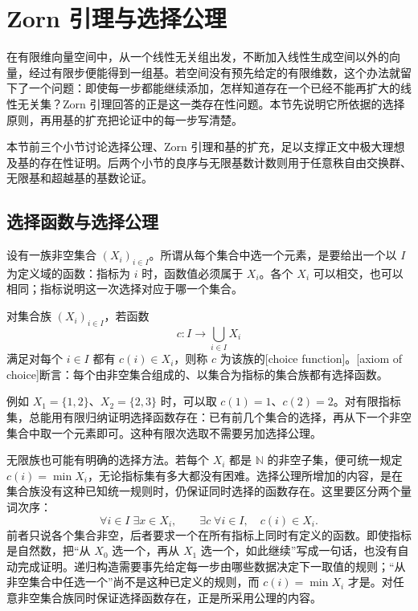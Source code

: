 
\section{Zorn 引理与选择公理}
\label{b1:sec:A01}

在有限维向量空间中，从一个线性无关组出发，不断加入线性生成空间以外的向量，经过有限步便能得到一组基。若空间没有预先给定的有限维数，这个办法就留下了一个问题：即使每一步都能继续添加，怎样知道存在一个已经不能再扩大的线性无关集？Zorn 引理回答的正是这一类存在性问题。本节先说明它所依据的选择原则，再用基的扩充把论证中的每一步写清楚。

\ProseParagraphBreak
本节前三个小节讨论选择公理、Zorn 引理和基的扩充，足以支撑正文中极大理想及基的存在性证明。后两个小节的良序与无限基数计数则用于任意秩自由交换群、无限基和超越基的基数论证。

\subsection{选择函数与选择公理}
\label{b1:subsec:A01:01}

设有一族非空集合 \((X_i)_{i\in I}\)。所谓从每个集合中选一个元素，是要给出一个以 \(I\) 为定义域的函数：指标为 \(i\) 时，函数值必须属于 \(X_i\)。各个 \(X_i\) 可以相交，也可以相同；指标说明这一次选择对应于哪一个集合。

\begin{definition}[选择公理]\label{b1:def:A-choice}
	对集合族 \((X_i)_{i\in I}\)，若函数
	\[
		c:I\longrightarrow\bigcup_{i\in I}X_i
	\]
	满足对每个 \(i\in I\) 都有 \(c(i)\in X_i\)，则称 \(c\) 为该族的[choice function]。[axiom of choice]断言：每个由非空集合组成的、以集合为指标的集合族都有选择函数。
\end{definition}

例如 \(X_1=\{1,2\}\)、\(X_2=\{2,3\}\) 时，可以取 \(c(1)=1\)、\(c(2)=2\)。对有限指标集，总能用有限归纳证明选择函数存在：已有前几个集合的选择，再从下一个非空集合中取一个元素即可。这种有限次选取不需要另加选择公理。

\ProseParagraphBreak
无限族也可能有明确的选择方法。若每个 \(X_i\) 都是 \(\mathbb N\) 的非空子集，便可统一规定 \(c(i)=\min X_i\)，无论指标集有多大都没有困难。选择公理所增加的内容，是在集合族没有这种已知统一规则时，仍保证同时选择的函数存在。这里要区分两个量词次序：
\[
	\forall i\in I\;\exists x\in X_i, \qquad \exists c\;\forall i\in I,\quad c(i)\in X_i.
\]
前者只说各个集合非空，后者要求一个在所有指标上同时有定义的函数。即使指标是自然数，把“从 \(X_0\) 选一个，再从 \(X_1\) 选一个，如此继续”写成一句话，也没有自动完成证明。递归构造需要事先给定每一步由哪些数据决定下一取值的规则；“从非空集合中任选一个”尚不是这种已定义的规则，而 \(c(i)=\min X_i\) 才是。对任意非空集合族同时保证选择函数存在，正是所采用公理的内容。

